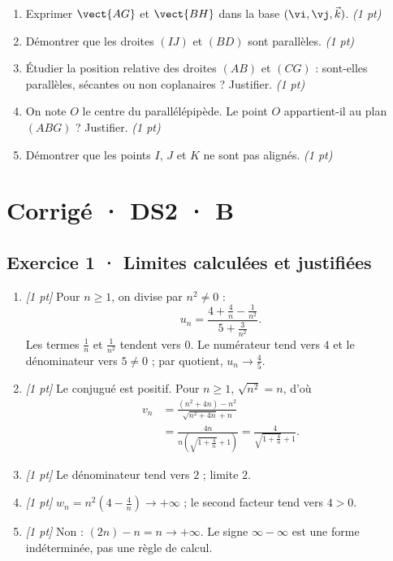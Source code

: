 \begin{enumerate}

\item Exprimer $\vect{AG}$ et $\vect{BH}$ dans la base $(\vi,\vj,\vec k)$. \hfill\textit{(1 pt)}

\item Démontrer que les droites $(IJ)$ et $(BD)$ sont parallèles. \hfill\textit{(1 pt)}

\item Étudier la position relative des droites $(AB)$ et $(CG)$ : sont-elles parallèles, sécantes ou non coplanaires ? Justifier. \hfill\textit{(1 pt)}

\item On note $O$ le centre du parallélépipède. Le point $O$ appartient-il au plan $(ABG)$ ? Justifier. \hfill\textit{(1 pt)}

\item Démontrer que les points $I$, $J$ et $K$ ne sont pas alignés. \hfill\textit{(1 pt)}

\end{enumerate}

\ifprof\clearpage

\section*{Corrigé · DS2 · B}\label{cor:2-4}

\subsection*{Exercice 1 · Limites calculées et justifiées}\begin{enumerate}

\item \textit{[1 pt]} Pour $n\ge1$, on divise par $n^2\ne0$ :
\[u_n=\frac{4+\frac{4}{n}-\frac{1}{n^2}}{5+\frac{3}{n^2}}.\]
Les termes $\frac{1}{n}$ et $\frac{1}{n^2}$ tendent vers $0$. Le numérateur tend vers $4$ et le dénominateur vers $5\ne0$ ; par quotient, $u_n\to\frac{4}{5}$.

\item \textit{[1 pt]} Le conjugué est positif. Pour $n\ge1$, $\sqrt{n^2}=n$, d'où
\[\begin{aligned}v_n&=\frac{(n^2+4n)-n^2}{\sqrt{n^2+4n}+n}\\&=\frac{4n}{n(\sqrt{1+\frac{4}{n}}+1)}=\frac{4}{\sqrt{1+\frac{4}{n}}+1}.\end{aligned}\]

\item \textit{[1 pt]} Le dénominateur tend vers $2$ ; limite $2$.

\item \textit{[1 pt]} $w_n=n^2(4-\frac{4}{n})\to+\infty$ ; le second facteur tend vers $4>0$.

\item \textit{[1 pt]} Non : $(2n)-n=n\to+\infty$. Le signe $\infty-\infty$ est une forme indéterminée, pas une règle de calcul.

\end{enumerate}

